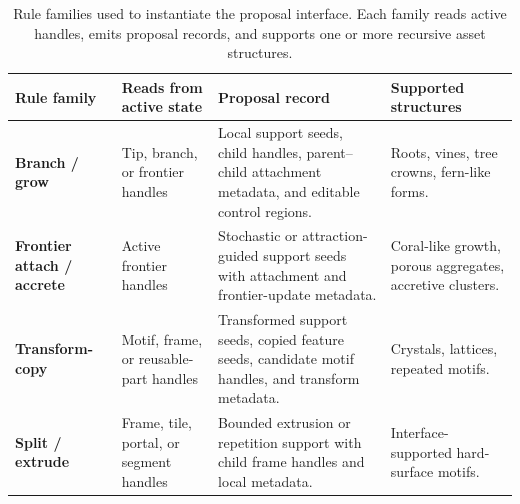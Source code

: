 \documentclass[acmtog,anonymous,review]{acmart}
\begin{document}
\begin{table}[t]
  \centering
  \caption{Rule families used to instantiate the proposal interface. Each family reads active handles, emits proposal records, and supports one or more recursive asset structures.}
  \label{tab:rule-families}
  \begin{tabular}{@{}p{}p{}p{}p{}@{}}
    \toprule
    Rule family & Reads from active state & Proposal record & Supported structures \\
    \midrule
    \textbf{Branch / grow} &
    Tip, branch, or frontier handles &
    Local support seeds, child handles, parent--child attachment metadata, and editable control regions. &
    Roots, vines, tree crowns, fern-like forms. \\
    \textbf{Frontier attach / accrete} &
    Active frontier handles &
    Stochastic or attraction-guided support seeds with attachment and frontier-update metadata. &
    Coral-like growth, porous aggregates, accretive clusters. \\
    \textbf{Transform-copy} &
    Motif, frame, or reusable-part handles &
    Transformed support seeds, copied feature seeds, candidate motif handles, and transform metadata. &
    Crystals, lattices, repeated motifs. \\
    \textbf{Split / extrude} &
    Frame, tile, portal, or segment handles &
    Bounded extrusion or repetition support with child frame handles and local metadata. &
    Interface-supported hard-surface motifs. \\
    \bottomrule
  \end{tabular}
\end{table}
\end{document}
